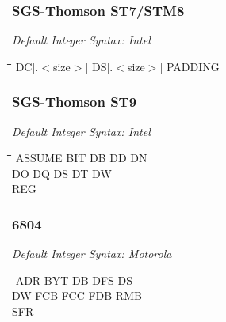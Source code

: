 \subsubsection{SGS-Thomson ST7/STM8}

{\em Default Integer Syntax: Intel}

{\tt\begin{tabbing}
\hspace{3cm}\=\hspace{3cm}\=\hspace{3cm}\=\hspace{3cm}\=\kill
DC[.$<$size$>$] \> DS[.$<$size$>$]   \> PADDING \\
\end{tabbing}}

\subsubsection{SGS-Thomson ST9}

{\em Default Integer Syntax: Intel}

{\tt\begin{tabbing}
\hspace{3cm}\=\hspace{3cm}\=\hspace{3cm}\=\hspace{3cm}\=\kill
ASSUME     \> BIT         \> DB          \> DD          \> DN \\
DO         \> DQ          \> DS          \> DT          \> DW \\
REG \\
\end{tabbing}}

\subsubsection{6804}

{\em Default Integer Syntax: Motorola}

{\tt\begin{tabbing}
\hspace{3cm}\=\hspace{3cm}\=\hspace{3cm}\=\hspace{3cm}\=\kill
ADR        \> BYT         \> DB          \> DFS         \> DS \\
DW         \> FCB         \> FCC         \> FDB         \> RMB \\
SFR \\
\end{tabbing}}

